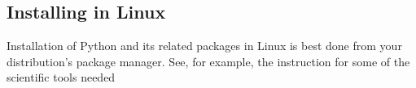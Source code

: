 %
%
%
%
%
%
%
%
%
%
%
% 
%
%
%

%
%
%
%

\subsection{Installing in Linux}

Installation of Python and its related packages in Linux is best done from your
distribution's package manager. See, for example, the instruction for some of the
scientific tools needed 

